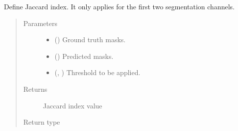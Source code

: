 \documentclass[letterpaper,10pt,english]{sphinxmanual}
\begin{document}
\begin{fulllineitems}
\label{\detokenize{engine/metrics:engine.metrics.jaccard_index_instances}}
Define Jaccard index. It only applies for the first two segmentation
channels.
\begin{quote}\begin{description}
\item[{Parameters}] \leavevmode\begin{itemize}
\item {} 
 () \textendash{} Ground truth masks.

\item {} 
 () \textendash{} Predicted masks.

\item {} 
 (, ) \textendash{} Threshold to be applied.

\end{itemize}

\item[{Returns}] \leavevmode
{} \textendash{} Jaccard index value

\item[{Return type}] \leavevmode
{}

\end{description}\end{quote}

\end{fulllineitems}

\end{document}

